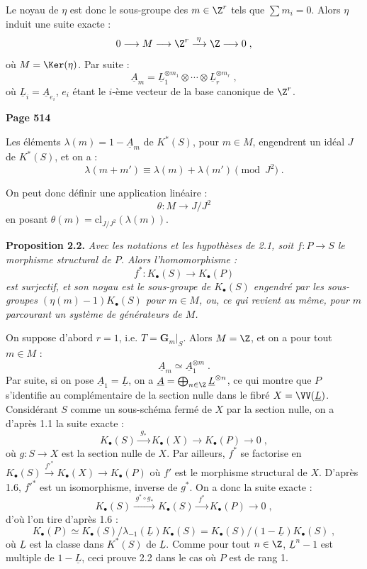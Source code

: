 Le noyau de $\eta$ est donc le sous-groupe des $m \in \Z^r$ tels que $\sum m_i = 0$. Alors $\eta$ induit une suite exacte :
\[
0 \longrightarrow M \longrightarrow \Z^r \xrightarrow{\;\eta\;} \Z \longrightarrow 0\;,
\]
o\`u $M = \Ker(\eta)$. Par suite :
\[
\underline{A}_m = \underline{L}_1^{\otimes m_1} \otimes \cdots \otimes \underline{L}_r^{\otimes m_r}\;,
\]
o\`u $\underline{L}_i = \underline{A}_{e_i}$, $e_i$ \'etant le $i$-\`eme vecteur de la base canonique de $\Z^r$.

\newpage
\noindent\textbf{Page 514}

Les \'el\'ements $\lambda(m) = 1 - \underline{A}_m$ de $K^*(S)$, pour $m \in M$, engendrent un id\'eal $J$ de $K^*(S)$, et on a :
\[
\lambda(m + m') \equiv \lambda(m) + \lambda(m') \pmod{J^2}\;.
\]

On peut donc d\'efinir une application lin\'eaire :
\[
\theta : M \longrightarrow J/J^2
\]
en posant $\theta(m) = \mathrm{cl}_{J/J^2}(\lambda(m))$.

\smallskip
\noindent\textbf{Proposition 2.2.} \textit{Avec les notations et les hypoth\`eses de 2.1, soit $f : P \longrightarrow S$ le morphisme structural de $P$. Alors l'homomorphisme :
\[
f^* : K_\bullet(S) \longrightarrow K_\bullet(P)
\]
est surjectif, et son noyau est le sous-groupe de $K_\bullet(S)$ engendr\'e par les sous-groupes $(\eta(m) - 1)K_\bullet(S)$ pour $m \in M$, ou, ce qui revient au m\^eme, pour $m$ parcourant un syst\`eme de g\'en\'erateurs de $M$.}

On suppose d'abord $r = 1$, i.e. $T = \mathbf{G}_m|_S$. Alors $M = \Z$, et on a pour tout $m \in M$ :
\[
\underline{A}_m \simeq \underline{A}_1^{\otimes m}\;.
\]
Par suite, si on pose $\underline{A}_1 = \underline{L}$, on a $\underline{A} = \bigoplus_{n \in \Z} \underline{L}^{\otimes n}$, ce qui montre que $P$ s'identifie au compl\'ementaire de la section nulle dans le fibr\'e $X = \VV(\underline{L})$. Consid\'erant $S$ comme un sous-sch\'ema ferm\'e de $X$ par la section nulle, on a d'apr\`es 1.1 la suite exacte :
\[
K_\bullet(S) \xrightarrow{\;g_*\;} K_\bullet(X) \longrightarrow K_\bullet(P) \longrightarrow 0\;,
\]
o\`u $g : S \longrightarrow X$ est la section nulle de $X$. Par ailleurs, $f^*$ se factorise en $K_\bullet(S) \xrightarrow{f'^*} K_\bullet(X) \longrightarrow K_\bullet(P)$ o\`u $f'$ est le morphisme structural de $X$. D'apr\`es 1.6, $f'^*$ est un isomorphisme, inverse de $g^*$. On a donc la suite exacte :
\[
K_\bullet(S) \xrightarrow{\;g^* \circ g_*\;} K_\bullet(S) \xrightarrow{\;f^*\;} K_\bullet(P) \longrightarrow 0\;,
\]
d'o\`u l'on tire d'apr\`es 1.6 :
\[
K_\bullet(P) \simeq K_\bullet(S)/\lambda_{-1}(\underline{L})K_\bullet(S) = K_\bullet(S)/(1-\underline{L})K_\bullet(S)\;,
\]
o\`u $\underline{L}$ est la classe dans $K^*(S)$ de $\underline{L}$. Comme pour tout $n \in \Z$, $\underline{L}^n - 1$ est multiple de $1 - \underline{L}$, ceci prouve 2.2 dans le cas o\`u $P$ est de rang 1.

